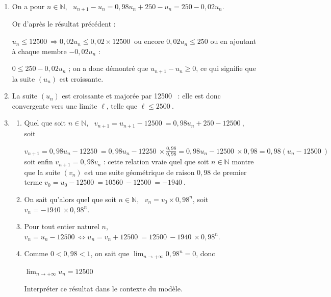 \documentclass[10pt]{article}
\providecommand{\N}{\mathbb{N}}
\providecommand{\np}[2][]{{#2~#1}}
\begin{document}
\begin{enumerate}
\emph{Hérédité} : soit $n \in \N$ tel que $u_n \leqslant \np{12500}$ soit en multipliant par 0,98 :

$0,98u_n \leqslant 0,98 \times \np{12500}$ et en ajoutant 250 à chaque membre :

$0,98u_n + 250  \leqslant 0,98 \times \np{12500} + 250$ ou $u_{n+1}  \leqslant \np{12250} + 250 $ et finalement $u_{n+1} \leqslant \np{12500}$ : la proposition est vraie au r	ng $n + 1$.

La proposition est vraie au rang 0 et si elle est vraie au rang $n \in \N$ elle est vraie au rang $n + 1$ : d'après le principe de la récurrence la proposition $u_n \leqslant \np{12500}$ est vraie pur tout naturel $n \in \N$.
\item 
On a pour $n \in \N$, \, $u_{n+1} - u_n = 0,98u_n + 250 - u_n = 250  - 0,02u_n$.

Or d'après le résultat précédent :

$u_n \leqslant \np{12500} \Rightarrow 0,02u_n \leqslant 0,02 \times \np{12500}$ ou encore $0,02u_n \leqslant 250$ ou en ajoutant à chaque membre $- 0,02u_n$ :

$0 \leqslant 250 - 0,02u_n$ ; on a donc démontré que $u_{n+1} - u_n  \geqslant 0$, ce qui signifie que la suite $\left(u_n\right)$ est croissante.
\item 
La suite $\left(u_n\right)$ est croissante et majorée par \np{12500} : elle est donc convergente vers une limite $\ell$, telle que $\ell \leqslant \np{2500}$.
\item 
	\begin{enumerate}
		\item 
		Quel que soit $n \in \N$, \, $v_{n+1} = u_{n+1} - \np{12500} = 0,98u_n + 250 - \np{12500}$, soit 
		
		$v_{n+1}  = 0,98u_n - \np{12250} = 0,98u_n - \np{12250}\times \frac{0,98}{0,98} = 0,98u_n - \np{12500} \times 0,98 = 0,98\left(u_n - \np{12500}\right)$ soit enfin $v_{n+1} = 0,98v_n$ : cette relation vraie quel que soit $n \in \N$ montre que la suite $\left(v_n\right)$ est une suite géométrique de raison $0,98$ de premier terme $v_0 = u_0 - \np{12500} = \np{10560} - \np{12500} = - \np{1940}$.
		\item 
		On sait qu'alors quel que soit $n \in \N$, \, $v_n = v_0 \times 0,98^n$, soit $v_n = - \np{1940} \times 0,98^n$.
		\item 
Pour tout entier naturel $n$,\,$v_n = u_n - \np{12500} \iff u_n = v_n + \np{12500} = \np{12500} - \np{1940} \times 0,98^n$.
		\item 
		
Comme $0 < 0,98 < 1$, on sait que $\displaystyle\lim_{n \to + \infty} 0,98^n = 0$, donc 
		
$\displaystyle\lim_{n \to + \infty} u_n = \np{12500}$
		
Interpréter ce résultat dans le contexte du modèle.
	\end{enumerate}
\end{enumerate}
\end{document}
